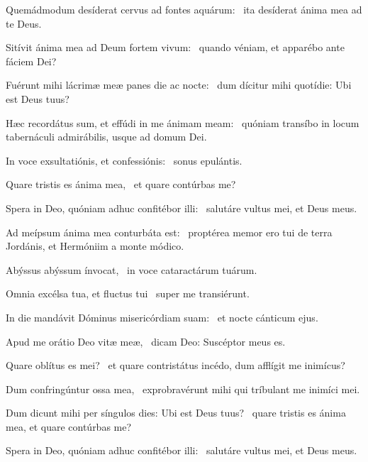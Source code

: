 \item Quemádmodum desíderat cervus ad fontes aquárum:~\psstar{} ita desíderat ánima mea ad te Deus.

\item Sitívit ánima mea ad Deum fortem vivum:~\psstar{} quando véniam, et apparébo ante fáciem Dei?

\item Fuérunt mihi lácrimæ meæ panes die ac nocte:~\psstar{} dum dícitur mihi quotídie: Ubi est Deus tuus?

\item Hæc recordátus sum, et effúdi in me ánimam meam:~\psstar{} quóniam transíbo in locum tabernáculi admirábilis, usque ad domum Dei.

\item In voce exsultatiónis, et confessiónis:~\psstar{} sonus epulántis.

\item Quare tristis es ánima mea,~\psstar{} et quare contúrbas me?

\item Spera in Deo, quóniam adhuc confitébor illi:~\psstar{} salutáre vultus mei, et Deus meus.

\item Ad meípsum ánima mea conturbáta est:~\psstar{} proptérea memor ero tui de terra Jordánis, et Hermóniim a monte módico.

\item Abýssus abýssum ínvocat,~\psstar{} in voce cataractárum tuárum.

\item Omnia excélsa tua, et fluctus tui~\psstar{} super me transiérunt.

\item In die mandávit Dóminus misericórdiam suam:~\psstar{} et nocte cánticum ejus.

\item Apud me orátio Deo vitæ meæ,~\psstar{} dicam Deo: Suscéptor meus es.

\item Quare oblítus es mei?~\psstar{} et quare contristátus incédo, dum afflígit me inimícus?

\item Dum confringúntur ossa mea,~\psstar{} exprobravérunt mihi qui tríbulant me inimíci mei.

\item Dum dicunt mihi per síngulos dies: Ubi est Deus tuus?~\psstar{} quare tristis es ánima mea, et quare contúrbas me?

\item Spera in Deo, quóniam adhuc confitébor illi:~\psstar{} salutáre vultus mei, et Deus meus.
